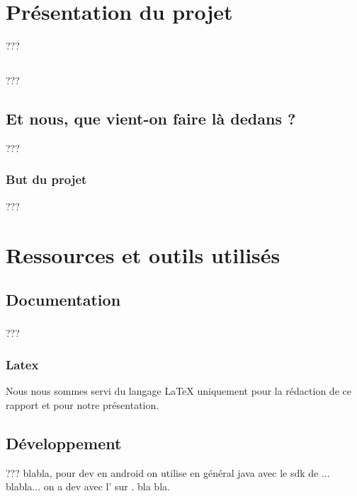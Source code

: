 \documentclass[french]{report}
\begin{document}
\tableofcontents




\chapter{Présentation du projet}
???
\section{\pepit}
???
\section{Et nous, que vient-on faire là dedans ?}
???
\subsection{But du projet}
???


\chapter{Ressources et outils utilisés}
\section{Documentation}
\subsection{\googleDrive}
???
\subsection{Latex}
Nous nous sommes servi du langage \LaTeX{} uniquement pour la rédaction de ce rapport et pour notre présentation.
\section{Développement}
??? blabla, pour dev en android on utilise en général java avec le sdk de \google{}... blabla... on a dev avec l'\ide{} \eclipse{} sur \linux{}. bla bla.
\end{document}
